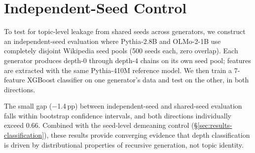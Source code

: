 \section{Independent-Seed Control}
\label{app:seed-control}

\begingroup\setlength{\parskip}{2pt plus 1pt}

To test for topic-level leakage from shared seeds across generators, we construct an independent-seed evaluation where Pythia-2.8B and OLMo-2-1B use completely disjoint Wikipedia seed pools (500 seeds each, zero overlap).
Each generator produces depth-0 through depth-4 chains on its own seed pool; features are extracted with the same Pythia-410M reference model.
We then train a 7-feature XGBoost classifier on one generator's data and test on the other, in both directions.

\begin{table}[ht]
\centering
\small
\caption{Independent-seed cross-generator evaluation (binary: gen-1 vs.\ gen-2+). Disjoint seed pools eliminate any possibility of topic-based leakage. The average independent-seed F1 (0.680) is within 1.4\,pp of the shared-seed LOGO baseline (0.694). The classifier thus captures generative degradation patterns rather than seed-specific topic content.}
\label{tab:seed-control}
\end{table}

The small gap ($-$1.4\,pp) between independent-seed and shared-seed evaluation falls within bootstrap confidence intervals, and both directions individually exceed 0.66.
Combined with the seed-level demeaning control (\S\ref{sec:results-classification}), these results provide converging evidence that depth classification is driven by distributional properties of recursive generation, not topic identity.

